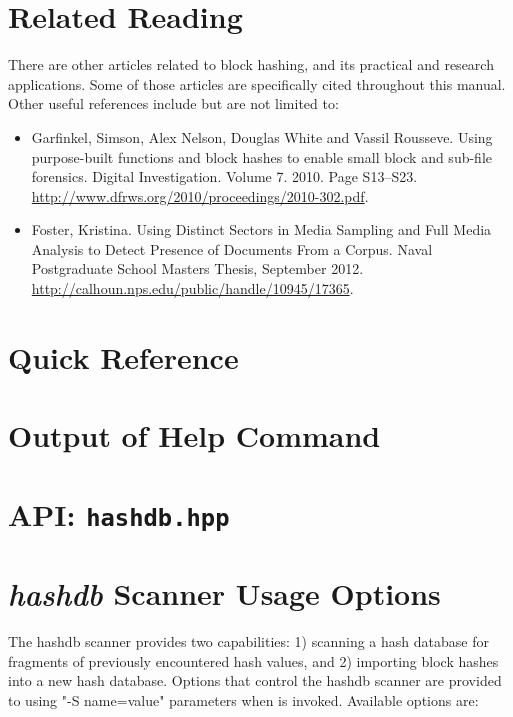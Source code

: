 \documentclass[11pt,fleqn]{article} %
\begin{document}
\section{Related Reading}
There are other articles related to block hashing, and its practical and research applications. Some of those articles are specifically cited throughout this manual. Other useful references include but are not limited to:
\begin{itemize}
\item Garfinkel, Simson, Alex Nelson, Douglas White and Vassil Rousseve. Using purpose-built functions and block hashes to enable small block and sub-file forensics. Digital Investigation. Volume 7. 2010. Page S13--S23. \url{http://www.dfrws.org/2010/proceedings/2010-302.pdf}.
\item Foster, Kristina. Using Distinct Sectors in Media Sampling and Full Media Analysis to Detect Presence of Documents From a Corpus. Naval Postgraduate School Masters Thesis, September 2012. \url{http://calhoun.nps.edu/public/handle/10945/17365}.
\end{itemize}

 


\newpage
\appendix
\appendixpage

\section{\hdb Quick Reference}
\label{QuickReference}

\newpage

\section{Output of \hdb Help Command}
\label{HelpOutput}
\begingroup
\footnotesize
{
\selectfont

}
\endgroup


\section{\hdb API: \texttt{hashdb.hpp}}
\label{hashdbapi}
\lstset{language=C++}
\lstset{basicstyle=\footnotesize}
\lstset{breaklines=true}
\lstset{breakatwhitespace=true}



\section{\bulk \textit{hashdb} Scanner Usage Options}
\label{scannerOptionsAppendix}
The \bulk hashdb scanner provides two capabilities: 1) scanning
a hash database for fragments of previously encountered hash values,
and 2) importing block hashes into a new hash database.
Options that control the hashdb
scanner are provided to \bulk using "-S name=value" parameters
when \bulk is invoked.  Available options are: 

\begingroup
\footnotesize
{
\selectfont

}
\endgroup
\end{document}
